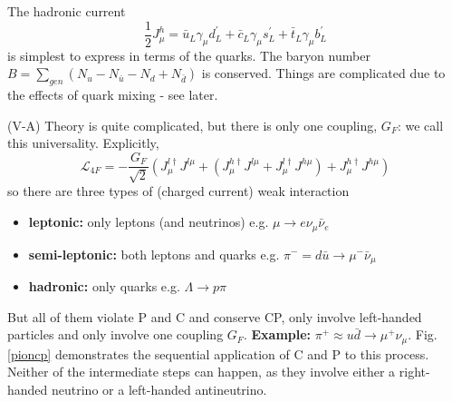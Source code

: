 \documentclass[a4paper,12pt]{article}
\begin{document}
The hadronic current
\begin{equation}
\frac{1}{2}J_\mu^h = \bar{u}_L\gamma_\mu d_L^\prime + \bar{c}_L \gamma_\mu s_L^\prime + \bar{t}_L \gamma_\mu b_L^\prime
\end{equation}
is simplest to express in terms of the quarks. The baryon number $B = \sum_{gen} (N_u -N_{\bar{u}} - N_d + N_{\bar{d}})$ is conserved. Things are complicated due to the effects of quark mixing - see later.

(V-A) Theory is quite complicated, but there is only one coupling, $G_F$: we call this universality. Explicitly,
\begin{equation}
\mathcal{L}_{4F} = -\frac{G_F}{\sqrt{2}} (J_\mu^{l \dagger} J^{l\mu} + (J_\mu^{h \dagger} J^{l\mu} + J_\mu^{l \dagger} J^{h\mu}) + J_\mu^{h \dagger} J^{h\mu} ) 
\end{equation}
so there are three types of (charged current) weak interaction
\begin{itemize}
    \item \textbf{leptonic:} only leptons (and neutrinos) e.g. $\mu \to e \nu_\mu \bar{\nu}_e$
    \item \textbf{semi-leptonic:} both leptons and quarks e.g. $\pi^- = d\bar{u} \to \mu^- \bar{\nu}_\mu$
    \item \textbf{hadronic:} only quarks e.g. $\Lambda \to p \pi$
\end{itemize}
But all of them violate P and C and conserve CP, only involve left-handed particles and only involve one coupling $G_F$. 
\newline
\newline
\textbf{Example:} $\pi^+ \approx u\bar{d} \to \mu^+ \nu_\mu$. 
\newline
Fig. \ref{pioncp} demonstrates the sequential application of C and P to this process. Neither of the intermediate steps can happen, as they involve either a right-handed neutrino or a left-handed antineutrino.
\end{document}

